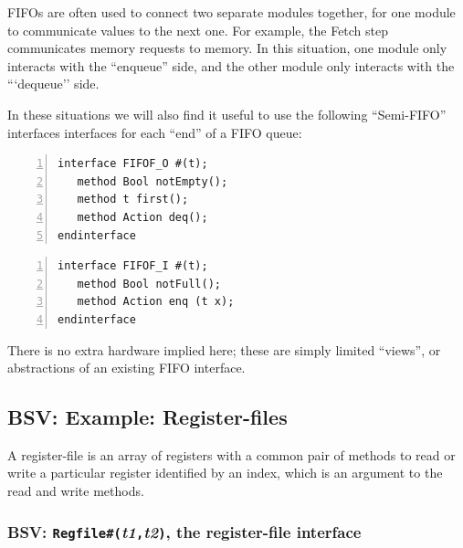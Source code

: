 FIFOs are often used to connect two separate modules together, for one
module to communicate values to the next one.  For example, the Fetch
step communicates memory requests to memory.  In this situation, one
module only interacts with the ``enqueue'' side, and the other module
only interacts with the ```dequeue'' side.

In these situations we will also find it useful to use the following
``Semi-FIFO'' interfaces interfaces for each ``end'' of a FIFO queue:


\begin{Verbatim}[frame=single, numbers=left]
interface FIFOF_O #(t);
   method Bool notEmpty();
   method t first();
   method Action deq();
endinterface
\end{Verbatim}


\begin{Verbatim}[frame=single, numbers=left]
interface FIFOF_I #(t);
   method Bool notFull();
   method Action enq (t x);
endinterface
\end{Verbatim}

There is no extra hardware implied here; these are simply limited
``views'', or abstractions of an existing FIFO interface.


\subsection{BSV: Example: Register-files}


A register-file is an array of registers with a common pair of methods
to read or write a particular register identified by an index, which
is an argument to the read and write methods.


\subsubsection{BSV: {\tt Regfile\#(}\emph{t1}{\tt ,}\emph{t2}{\tt )}, the register-file interface}

\label{Sec_Magritte_Fetch_Decode_RegFile_interface}

